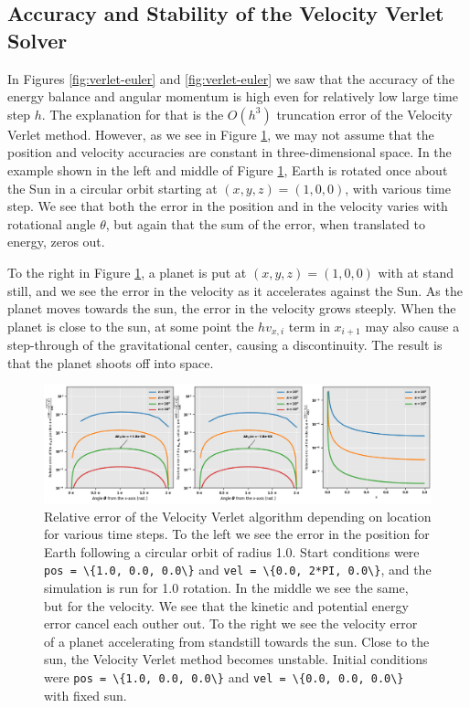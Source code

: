 \documentclass[]{article}
\begin{document}
\subsection{Accuracy and Stability of the Velocity Verlet Solver}
In Figures \ref{fig:verlet-euler} and \ref{fig:verlet-euler} we saw that the accuracy of the energy balance and angular momentum is high even for relatively low large time step $h$. The explanation for that is the $O(h^3)$ truncation error of the Velocity Verlet method. However, as we see in Figure \ref{fig:error}, we may not assume that the position and velocity accuracies are constant in three-dimensional space. In the example shown in the left and middle of Figure \ref{fig:error}, Earth is rotated once about the Sun in a circular orbit starting at $(x,y,z)=(1,0,0)$, with various time step. We see that both the error in the position and in the velocity varies with rotational angle $\theta$, but again that the sum of the error, when translated to energy, zeros out.

To the right in Figure \ref{fig:error}, a planet is put at $(x,y,z)=(1,0,0)$ with at stand still, and we see the error in the velocity as it accelerates against the Sun. As the planet moves towards the sun, the error in the velocity grows steeply. When the planet is close to the sun, at some point the $hv_{x,i}$ term in $x_{i+1}$ may also cause a step-through of the gravitational center, causing a discontinuity. The result is that the planet shoots off into space.

\begin{figure}[!htb]
	\centering
	\includegraphics[width=1\linewidth]{error.png}
	\caption{Relative error of the Velocity Verlet algorithm depending on location for various time steps. To the left we see the error in the position for Earth following a circular orbit of radius 1.0. Start conditions were \lstinline|pos = \{1.0, 0.0, 0.0\}| and \lstinline|vel = \{0.0, 2*PI, 0.0\}|, and the simulation is run for 1.0 rotation. In the middle we see the same, but for the velocity. We see that the kinetic and potential energy error cancel each outher out. To the right we see the velocity error of a planet accelerating from standstill towards the sun. Close to the sun, the Velocity Verlet method becomes unstable. Initial conditions were \lstinline|pos = \{1.0, 0.0, 0.0\}| and \lstinline|vel = \{0.0, 0.0, 0.0\}| with fixed sun.}
	\label{fig:error}
\end{figure}
\end{document}
